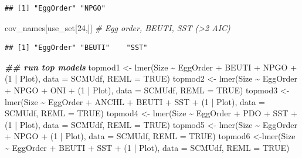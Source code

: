 \documentclass[
]{article}
\newenvironment{Shaded}{\begin{snugshade}}{\end{snugshade}}
\newcommand{\AttributeTok}[1]{\textcolor[rgb]{0.77,0.63,0.00}{#1}}
\newcommand{\CommentTok}[1]{\textcolor[rgb]{0.56,0.35,0.01}{\textit{#1}}}
\newcommand{\ConstantTok}[1]{\textcolor[rgb]{0.00,0.00,0.00}{#1}}
\newcommand{\DecValTok}[1]{\textcolor[rgb]{0.00,0.00,0.81}{#1}}
\newcommand{\DocumentationTok}[1]{\textcolor[rgb]{0.56,0.35,0.01}{\textbf{\textit{#1}}}}
\newcommand{\FunctionTok}[1]{\textcolor[rgb]{0.00,0.00,0.00}{#1}}
\newcommand{\NormalTok}[1]{#1}
\newcommand{\OtherTok}[1]{\textcolor[rgb]{0.56,0.35,0.01}{#1}}
\newcommand{\SpecialCharTok}[1]{\textcolor[rgb]{0.00,0.00,0.00}{#1}}
\begin{document}
\begin{verbatim}
## [1] "EggOrder" "NPGO"
\end{verbatim}

\begin{Shaded}
\begin{Highlighting}[]
\NormalTok{cov\_names[use\_set[}\DecValTok{24}\NormalTok{,]] }\CommentTok{\# Egg order, BEUTI, SST (\textgreater{}2 AIC)}
\end{Highlighting}
\end{Shaded}

\begin{verbatim}
## [1] "EggOrder" "BEUTI"    "SST"
\end{verbatim}

\begin{Shaded}
\begin{Highlighting}[]
\DocumentationTok{\#\# run top models}
\NormalTok{topmod1 }\OtherTok{\textless{}{-}} \FunctionTok{lmer}\NormalTok{(Size }\SpecialCharTok{\textasciitilde{}}\NormalTok{ EggOrder }\SpecialCharTok{+}\NormalTok{ BEUTI }\SpecialCharTok{+}\NormalTok{ NPGO }\SpecialCharTok{+}\NormalTok{ (}\DecValTok{1} \SpecialCharTok{|}\NormalTok{ Plot), }\AttributeTok{data =}\NormalTok{ SCMUdf, }\AttributeTok{REML =} \ConstantTok{TRUE}\NormalTok{)}
\NormalTok{topmod2 }\OtherTok{\textless{}{-}} \FunctionTok{lmer}\NormalTok{(Size }\SpecialCharTok{\textasciitilde{}}\NormalTok{ EggOrder }\SpecialCharTok{+}\NormalTok{ NPGO }\SpecialCharTok{+}\NormalTok{ ONI }\SpecialCharTok{+}\NormalTok{ (}\DecValTok{1} \SpecialCharTok{|}\NormalTok{ Plot), }\AttributeTok{data =}\NormalTok{ SCMUdf, }\AttributeTok{REML =} \ConstantTok{TRUE}\NormalTok{)}
\NormalTok{topmod3 }\OtherTok{\textless{}{-}} \FunctionTok{lmer}\NormalTok{(Size }\SpecialCharTok{\textasciitilde{}}\NormalTok{ EggOrder }\SpecialCharTok{+}\NormalTok{ ANCHL }\SpecialCharTok{+}\NormalTok{ BEUTI }\SpecialCharTok{+}\NormalTok{ SST }\SpecialCharTok{+}\NormalTok{ (}\DecValTok{1} \SpecialCharTok{|}\NormalTok{ Plot), }\AttributeTok{data =}\NormalTok{ SCMUdf, }\AttributeTok{REML =} \ConstantTok{TRUE}\NormalTok{)}
\NormalTok{topmod4 }\OtherTok{\textless{}{-}} \FunctionTok{lmer}\NormalTok{(Size }\SpecialCharTok{\textasciitilde{}}\NormalTok{ EggOrder }\SpecialCharTok{+}\NormalTok{ PDO }\SpecialCharTok{+}\NormalTok{ SST }\SpecialCharTok{+}\NormalTok{ (}\DecValTok{1} \SpecialCharTok{|}\NormalTok{ Plot), }\AttributeTok{data =}\NormalTok{ SCMUdf, }\AttributeTok{REML =} \ConstantTok{TRUE}\NormalTok{)}
\NormalTok{topmod5 }\OtherTok{\textless{}{-}} \FunctionTok{lmer}\NormalTok{(Size }\SpecialCharTok{\textasciitilde{}}\NormalTok{ EggOrder }\SpecialCharTok{+}\NormalTok{ NPGO }\SpecialCharTok{+}\NormalTok{ (}\DecValTok{1} \SpecialCharTok{|}\NormalTok{ Plot), }\AttributeTok{data =}\NormalTok{ SCMUdf, }\AttributeTok{REML =} \ConstantTok{TRUE}\NormalTok{)}
\NormalTok{topmod6 }\OtherTok{\textless{}{-}}\FunctionTok{lmer}\NormalTok{(Size }\SpecialCharTok{\textasciitilde{}}\NormalTok{ EggOrder }\SpecialCharTok{+}\NormalTok{ BEUTI }\SpecialCharTok{+}\NormalTok{ SST }\SpecialCharTok{+}\NormalTok{ (}\DecValTok{1} \SpecialCharTok{|}\NormalTok{ Plot), }\AttributeTok{data =}\NormalTok{ SCMUdf, }\AttributeTok{REML =} \ConstantTok{TRUE}\NormalTok{)}


\end{Highlighting}
\end{Shaded}
\end{document}
